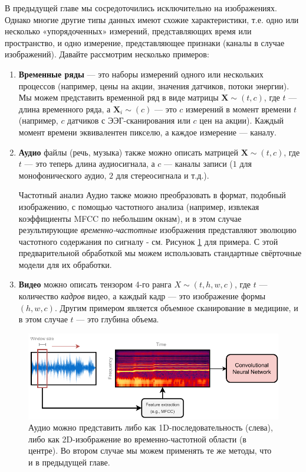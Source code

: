 В предыдущей главе мы сосредоточились исключительно на изображениях. Однако многие другие типы данных имеют схожие характеристики, т.е. одно или несколько «упорядоченных» измерений, представляющих время или пространство, и одно измерение, представляющее признаки (каналы в случае изображений). Давайте рассмотрим несколько примеров:
%
\begin{enumerate}
\item \textbf{Временные ряды} — это наборы измерений одного или нескольких процессов (например, цены на акции, значения датчиков, потоки энергии). Мы можем представить временной ряд в виде матрицы $\mathbf{X} \sim (t,c)$, где $t$ — длина временного ряда, а $\mathbf{X}_i \sim (c)$ — это $c$ измерений в момент времени $t$ (например, $c$ датчиков с ЭЭГ-сканирования или $c$ цен на акции). Каждый момент времени эквивалентен пикселю, а каждое измерение — каналу.
\item \textbf{Аудио} файлы (речь, музыка) также можно описать матрицей $\mathbf{X} \sim (t,c)$, где $t$ — это теперь длина аудиосигнала, а $c$ — каналы записи ($1$ для монофонического аудио, $2$ для стереосигнала и т.д.). 
%
\begin{supportbox}{Частотный анализ}
    Аудио также можно преобразовать в формат, подобный изображению, с помощью частотного анализа (например, извлекая коэффициенты MFCC по небольшим окнам), и в этом случае результирующие \textit{временно-частотные} изображения представляют эволюцию частотного содержания по сигналу - см. Рисунок \ref{fig:audio_analysis_frequency} для примера. С этой предварительной обработкой мы можем использовать стандартные свёрточные модели для их обработки.
\end{supportbox}
    \item \textbf{Видео} можно описать тензором 4-го ранга $X \sim (t, h, w, c)$, где $t$ — количество \textit{кадров} видео, а каждый кадр — это изображение формы $(h,w,c)$. Другим примером является объемное сканирование в медицине, и в этом случае $t$ — это глубина объема.
\end{enumerate}

\begin{figure}
    \centering
    \includegraphics[width=1.0\textwidth]{images/audio_classification_CNN}
    \caption{Аудио можно представить либо как 1D-последовательность (слева), либо как 2D-изображение во временно-частотной области (в центре). Во втором случае мы можем применять те же методы, что и в предыдущей главе.}
    \label{fig:audio_analysis_frequency}
\end{figure}

